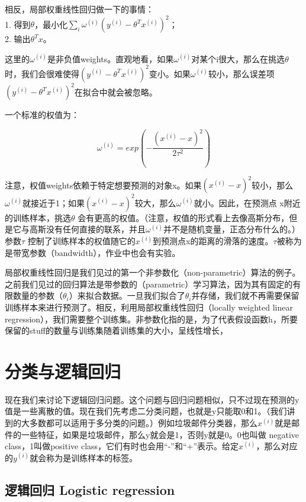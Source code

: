 \documentclass[UTF8]{ctexart}
\begin{document}
相反，局部权重线性回归做一下的事情：\\
1. 得到$\theta$，最小化$\sum_{i} \omega^{(i)}(y^{(i)}-\theta^{T}x^{(i)})^{2}$； \\
2. 输出$\theta^{T}x$。


这里的$\omega^{(i)}$是非负值weights。直观地看，如果$\omega^{(i)}$对某个i很大，那么在挑选$\theta$时，我们会很难使得$(y^{(i)}-\theta^{T}x^{(i)})^{2}$变小。如果$\omega^{(i)}$较小，那么误差项$(y^{(i)}-\theta^{T}x^{(i)})^{2}$在拟合中就会被忽略。

一个标准的权值为：

\[ \omega^{(i)} = exp(-\frac{(x^{(i)}-x)^{2}}{2\tau^{2}})\]

注意，权值weights依赖于特定想要预测的对象x。如果$(x^{(i)}-x)^{2}$较小，那么$\omega^{(i)}$就接近于1；如果$(x^{(i)}-x)^{2}$较大，那么$\omega^{(i)}$就小。因此，在预测点
x附近的训练样本，挑选$\theta$ 会有更高的权值。（注意，权值的形式看上去像高斯分布，但是它与高斯没有任何直接的联系，并且$ \omega^{(i)}$并不是随机变量，正态分布什么的。）参数$\tau$ 控制了训练样本的权值随它的$x^{(i)}$到预测点x的距离的滑落的速度。$\tau$被称为是带宽参数（bandwidth），作业中也会有实验。


局部权重线性回归是我们见过的第一个非参数化（non-parametric）算法的例子。之前我们见过的回归算法是带参数的（parametric）学习算法，因为其有固定的有限数量的参数（$\theta_{i}$）来拟合数据。一旦我们拟合了$\theta_{i}$并存储，我们就不再需要保留训练样本来进行预测了。相反，利用局部权重线性回归（locally weighted linear regression），我们需要整个训练集。非参数化指的是，为了代表假设函数h，所要保留的stuff的数量与训练集随着训练集的大小，呈线性增长，



\section{分类与逻辑回归}

现在我们来讨论下逻辑回归问题。这个问题与回归问题相似，只不过现在预测的y值是一些离散的值。现在我们先考虑二分类问题，也就是y只能取0和1。（我们讲到的大多数都可以适用于多分类的问题。）例如垃圾邮件分类器，那么$x^{(i)}$就是邮件的一些特征，如果是垃圾邮件，那么y就会是1，否则y就是0。0也叫做 negative class，1叫做positive class，它们有时也会用“-”和“+”表示。给定$x^{(i)}$，那么对应的$y^{(i)}$就会称为是训练样本的标签。

\subsection{逻辑回归 Logistic regression}
\end{document}
